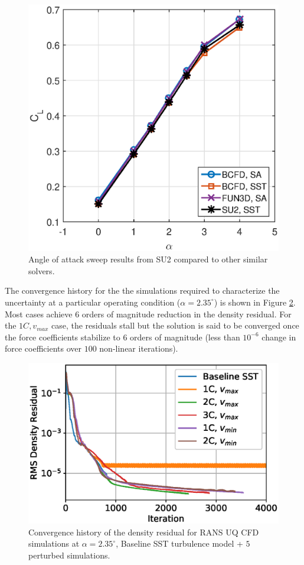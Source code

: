 \begin{figure}{
\centering
    \includegraphics[width=.68\textwidth]{images/dpw4_alpha_sweep.eps} 
    \caption{Angle of attack sweep results from SU2 compared to other similar solvers. \label{fig:dpw4_alpha_sweep}}
    \hfill
}
\end{figure}


The convergence history for the the simulations required to characterize the uncertainty at a particular operating condition ($\alpha = 2.35^\circ$) is shown in Figure \ref{fig:convergence_history}. Most cases achieve 6 orders of magnitude reduction in the density residual. For the $1C, v_{max}$ case, the residuals stall but the solution is said to be converged once the force coefficients stabilize to 6 orders of magnitude (less than $10^{-6}$ change in force coefficients over $100$ non-linear iterations).

\begin{figure}{
\centering
    \includegraphics[trim=0 0 0 0, clip, width=.7\textwidth]{images/convergence_history.eps} 
    \caption{Convergence history of the density residual for RANS UQ CFD simulations at $\alpha = 2.35^\circ$, Baseline SST turbulence model + $5$ perturbed simulations. \label{fig:convergence_history}}
    \hfill
}
\end{figure}


